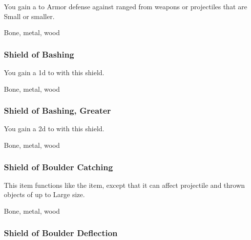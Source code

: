 You gain a   to Armor defense against ranged  from weapons or projectiles that are Small or smaller.



 


 Bone, metal, wood


\lowercase{\hypertarget{item:Shield of Bashing}{}}\label{item:Shield of Bashing}
\hypertarget{item:Shield of Bashing}{\subsubsection{Shield of Bashing\hfill{}}}

You gain a \plus1d  to  with this shield.



 Bone, metal, wood


\lowercase{\hypertarget{item:Shield of Bashing, Greater}{}}\label{item:Shield of Bashing, Greater}
\hypertarget{item:Shield of Bashing, Greater}{\subsubsection{Shield of Bashing, Greater\hfill{}}}

You gain a \plus2d  to  with this shield.



 Bone, metal, wood


\lowercase{\hypertarget{item:Shield of Boulder Catching}{}}\label{item:Shield of Boulder Catching}
\hypertarget{item:Shield of Boulder Catching}{\subsubsection{Shield of Boulder Catching\hfill{}}}

This item functions like the  item, except that it can affect projectile and thrown objects of up to Large size.



 


 Bone, metal, wood


\lowercase{\hypertarget{item:Shield of Boulder Deflection}{}}\label{item:Shield of Boulder Deflection}
\hypertarget{item:Shield of Boulder Deflection}{\subsubsection{Shield of Boulder Deflection\hfill{}}}

